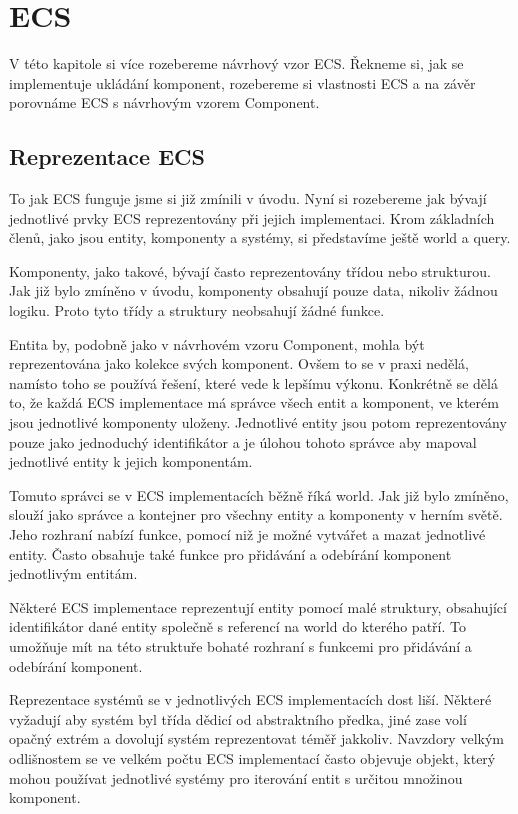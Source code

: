 \chapter{ECS}
\label{chap:ecs}
V této kapitole si více rozebereme návrhový vzor ECS. Řekneme si, jak se implementuje ukládání komponent, rozebereme si vlastnosti ECS a na závěr porovnáme ECS s návrhovým vzorem Component.

\section{Reprezentace ECS}
To jak ECS funguje jsme si již zmínili v úvodu. Nyní si rozebereme jak bývají jednotlivé prvky ECS reprezentovány při jejich implementaci. Krom základních členů, jako jsou entity, komponenty a systémy, si představíme ještě world a query.

Komponenty, jako takové, bývají často reprezentovány třídou nebo strukturou. Jak již bylo zmíněno v úvodu, komponenty obsahují pouze data, nikoliv žádnou logiku. Proto tyto třídy a struktury neobsahují žádné funkce.

Entita by, podobně jako v návrhovém vzoru Component, mohla být reprezentována jako kolekce svých komponent. Ovšem to se v praxi nedělá, namísto toho se používá řešení, které vede k lepšímu výkonu. Konkrétně se dělá to, že každá ECS implementace má správce všech entit a komponent, ve kterém jsou jednotlivé komponenty uloženy. Jednotlivé entity jsou potom reprezentovány pouze jako jednoduchý identifikátor a je úlohou tohoto správce aby mapoval jednotlivé entity k jejich komponentám.

Tomuto správci se v ECS implementacích běžně říká world. Jak již bylo zmíněno, slouží jako správce a kontejner pro všechny entity a komponenty v herním světě. Jeho rozhraní nabízí funkce, pomocí niž je možné vytvářet a mazat jednotlivé entity. Často obsahuje také funkce pro přidávání a odebírání komponent jednotlivým entitám.

Některé ECS implementace reprezentují entity pomocí malé struktury, obsahující identifikátor dané entity společně s referencí na world do kterého patří. To umožňuje mít na této struktuře bohaté rozhraní s funkcemi pro přidávání a odebírání komponent.

Reprezentace systémů se v jednotlivých ECS implementacích dost liší. Některé vyžadují aby systém byl třída dědicí od abstraktního předka, jiné zase volí opačný extrém a dovolují systém reprezentovat téměř jakkoliv. Navzdory velkým odlišnostem se ve velkém počtu ECS implementací často objevuje objekt, který mohou používat jednotlivé systémy pro iterování entit s určitou množinou komponent.


